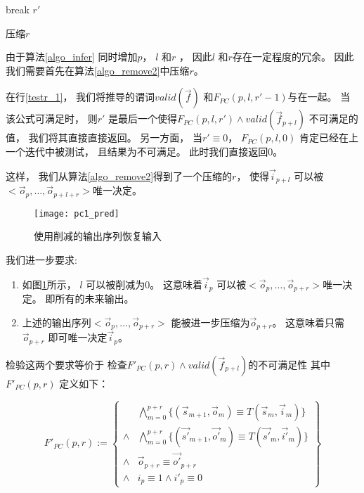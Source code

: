 \begin{algorithm}[t]
\begin{algorithmic}[1]
\label{testr_1}
    \STATE break
  \ENDIF
\ENDFOR
\RETURN $r'$
\caption{压缩$r$}
\label{algo_remove2}
\end{algorithmic}
\end{algorithm}

由于算法\ref{algo_infer} 同时增加$p$， $l$ 和$r$ ，
因此$l$ 和$r$存在一定程度的冗余。
因此我们需要首先在算法\ref{algo_remove2}中压缩$r$。


在行\ref{testr_1}，
我们将推导的谓词$valid(\vec{f})$ 和$F_{PC}(p,l,r'-1)$与在一起。
当该公式可满足时，
则$r'$ 是最后一个使得$F_{PC}(p,l,r')\wedge valid(\vec{f}_{p+l})$ 不可满足的值，
我们将其直接直接返回。
另一方面，
当$r'\equiv 0$，
$F_{PC}(p,l,0)$ 肯定已经在上一个迭代中被测试，
且结果为不可满足。
此时我们直接返回$0$。


这样，
我们从算法\ref{algo_remove2}得到了一个压缩的$r$，
使得$\vec{i}_{p+l}$ 可以被$<\vec{o}_{p},\dots,\vec{o}_{p+l+r}>$唯一决定。

\begin{figure}[b]
\begin{center}
\texttt{[image: pc1\_pred]}
\end{center}
\caption{使用削减的输出序列恢复输入}
  \label{fig_pc1}
\end{figure}

我们进一步要求:
\begin{enumerate}
 \item 如图\ref{fig_pc1}所示，
 $l$ 可以被削减为0。
 这意味着$\vec{i}_{p}$ 可以被$<\vec{o}_{p},\dots,\vec{o}_{p+r}>$唯一决定。
 即所有的未来输出。
 \item 上述的输出序列$<\vec{o}_{p},\dots,\vec{o}_{p+r}>$
 能被进一步压缩为$\vec{o}_{p+r}$。
 这意味着只需$\vec{o}_{p+r}$ 即可唯一决定$\vec{i}_p$。
\end{enumerate}

检验这两个要求等价于
检查$F'_{PC}(p,r)\wedge valid(\vec{f}_{p+l})$的不可满足性
其中$F'_{PC}(p,r)$ 定义如下：

\begin{equation}\label{uniqt11}
F'_{PC}(p,r):=
\left\{
\begin{array}{cc}
&\bigwedge_{m=0}^{p+r}
\{
(\vec{s}_{m+1},\vec{o}_m)\equiv T(\vec{s}_m,\vec{i}_m)
\}
\\
\wedge&\bigwedge_{m=0}^{p+r}
\{
(\vec{s'}_{m+1},\vec{o'}_m)\equiv T(\vec{s'}_m,\vec{i'}_m)
\}
\\
\wedge&\vec{o}_{p+r}\equiv \vec{o'}_{p+r} \\
\wedge& i_{p}\equiv 1 \wedge  i'_{p}\equiv 0
\end{array}
\right\}
\end{equation}



